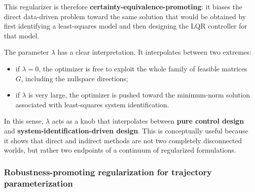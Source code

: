 This regularizer is therefore \textbf{certainty-equivalence-promoting}: it biases the direct
data-driven problem toward the same solution that would be obtained by first identifying a
least-squares model and then designing the LQR controller for that model.

The parameter $\lambda$ has a clear interpretation. It interpolates between two extremes:
\begin{itemize}
    \item if $\lambda=0$, the optimizer is free to exploit the whole family of feasible matrices $G$,
    including the nullspace directions;
    \item if $\lambda$ is very large, the optimizer is pushed toward the minimum-norm solution
    associated with least-squares system identification.
\end{itemize}
In this sense, $\lambda$ acts as a knob that interpolates between \textbf{pure control design} and
\textbf{system-identification-driven design}. This is conceptually useful because it shows that direct
and indirect methods are not two completely disconnected worlds, but rather two endpoints of a
continuum of regularized formulations.

\subsubsection{Robustness-promoting regularization for trajectory parameterization}

